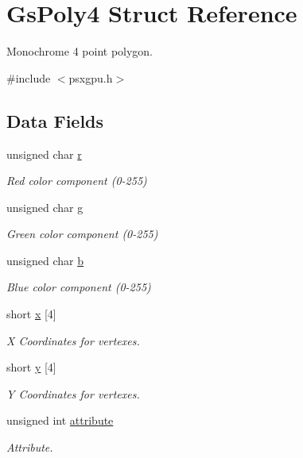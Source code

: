 \hypertarget{structGsPoly4}{}\section{Gs\+Poly4 Struct Reference}
\label{structGsPoly4}


Monochrome 4 point polygon.  




{\ttfamily \#include $<$psxgpu.\+h$>$}

\subsection*{Data Fields}
\begin{DoxyCompactItemize}
\item 
unsigned char \hyperlink{structGsPoly4_a80a1e6da3f60059a0de5d35b3c362b39}{r}
\begin{DoxyCompactList}\small\item\em Red color component (0-\/255) \end{DoxyCompactList}\item 
unsigned char \hyperlink{structGsPoly4_ad70029bd2ddc16663cee9e48c44bb290}{g}
\begin{DoxyCompactList}\small\item\em Green color component (0-\/255) \end{DoxyCompactList}\item 
unsigned char \hyperlink{structGsPoly4_ac720646ffe072a66a671f937b0d0ff26}{b}
\begin{DoxyCompactList}\small\item\em Blue color component (0-\/255) \end{DoxyCompactList}\item 
short \hyperlink{structGsPoly4_a8fc65921b04745ae353e3c84b5100e0e}{x} \mbox{[}4\mbox{]}
\begin{DoxyCompactList}\small\item\em X Coordinates for vertexes. \end{DoxyCompactList}\item 
short \hyperlink{structGsPoly4_ac3ac9fb14ed1df2858808b4de7981cd4}{y} \mbox{[}4\mbox{]}
\begin{DoxyCompactList}\small\item\em Y Coordinates for vertexes. \end{DoxyCompactList}\item 
unsigned int \hyperlink{structGsPoly4_ad58474b481cf8e41873f003916501985}{attribute}
\begin{DoxyCompactList}\small\item\em Attribute. \end{DoxyCompactList}\end{DoxyCompactItemize}


